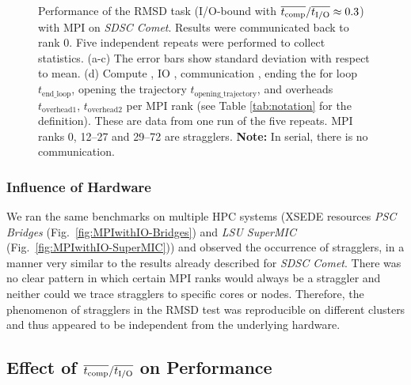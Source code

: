 \begin{figure}
\caption{Performance of the RMSD task (I/O-bound with $\overline{{t}_{\text{comp}}}/\overline{{t}_{\text{I/O}}} \approx 0.3$) with MPI on \emph{SDSC Comet}.
Results were communicated back to rank 0. Five independent repeats were performed to collect statistics. (a-c) The error bars show
standard deviation with respect to mean. (d) Compute \tcomp, IO \tIO, communication \tcomm, ending the for loop $t_{\text{end\_loop}}$,
  opening the trajectory $t_{\text{opening\_trajectory}}$, and overheads $t_{\text{overhead1}}$, $t_{\text{overhead2}}$ per MPI rank (see Table \ref{tab:notation} for the definition).
These are data from one run of the five repeats. MPI ranks 0, 12--27 and 29--72 are stragglers. \textbf{Note:} In serial, there is no communication.}
\label{fig:MPIwithIO}
\end{figure} 

\subsubsection*{Influence of Hardware}
We ran the same benchmarks on multiple HPC systems (XSEDE resources \emph{PSC Bridges} (Fig.~\ref{fig:MPIwithIO-Bridges}) and \emph{LSU SuperMIC} (Fig.~\ref{fig:MPIwithIO-SuperMIC})) and observed the occurrence of stragglers, in a manner very similar to the results already described for \emph{SDSC Comet}.
There was no clear pattern in which certain MPI ranks would always be a straggler and neither could we trace stragglers to specific cores or nodes. 
Therefore, the phenomenon of stragglers in the RMSD test was reproducible on different clusters and thus appeared to be independent from the underlying hardware.

\subsection{Effect of $\overline{{t}_{\text{comp}}}/\overline{{t}_{\text{I/O}}}$ on Performance}
\label{sec:bound}

